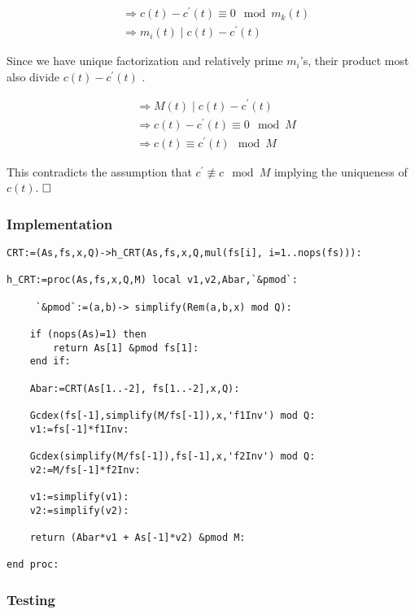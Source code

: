 \documentclass[10pt]{report}
\theoremstyle{plain}
\theoremstyle{definition}
\newcommand{\impl}{\Rightarrow}
\begin{document}
\begin{description}
\begin{align*}
	{}& \impl c(t)-c^\prime(t) \equiv 0 \mod m_k(t) \\
	{}& \impl m_i(t) \mid c(t) - c^\prime (t)
\end{align*}

Since we have unique factorization  and relatively prime $m_i$'s,  their product most also divide $c(t) - c^\prime(t)$ .

\begin{align*}
	{}& \impl M(t) \mid c(t) - c^\prime(t) \\
	{}& \impl c(t) - c^\prime(t) \equiv 0 \mod M\\
	{}& \impl c(t) \equiv c^\prime(t) \mod M
\end{align*}

This contradicts the assumption that $c^\prime \not\equiv c \mod M$ implying the uniqueness of $c(t)$.
$\hfill \Box$

\end{description}

\subsubsection*{Implementation}

\begin{verbatim}
CRT:=(As,fs,x,Q)->h_CRT(As,fs,x,Q,mul(fs[i], i=1..nops(fs))):

h_CRT:=proc(As,fs,x,Q,M) local v1,v2,Abar,`&pmod`:
     
     `&pmod`:=(a,b)-> simplify(Rem(a,b,x) mod Q):
     
    if (nops(As)=1) then
        return As[1] &pmod fs[1]:
    end if:
    
    Abar:=CRT(As[1..-2], fs[1..-2],x,Q):
    
    Gcdex(fs[-1],simplify(M/fs[-1]),x,'f1Inv') mod Q:
    v1:=fs[-1]*f1Inv:
    
    Gcdex(simplify(M/fs[-1]),fs[-1],x,'f2Inv') mod Q:
    v2:=M/fs[-1]*f2Inv:
    
    v1:=simplify(v1):
    v2:=simplify(v2):
    
    return (Abar*v1 + As[-1]*v2) &pmod M:

end proc:
\end{verbatim}

\subsubsection*{Testing}
\end{document}
